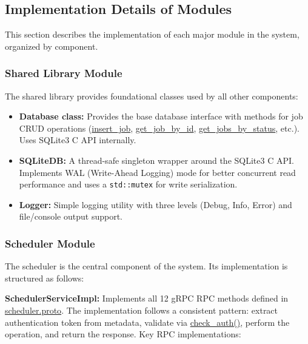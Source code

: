 \subsection{Implementation Details of Modules}

This section describes the implementation of each major module in the system, organized by component.

\subsubsection{Shared Library Module}

The shared library provides foundational classes used by all other components:

\begin{itemize}
	\item \textbf{Database class:} Provides the base database interface with methods for job CRUD operations (\url{insert_job}, \url{get_job_by_id}, \url{get_jobs_by_status}, etc.). Uses SQLite3 C API internally.
	\item \textbf{SQLiteDB:} A thread-safe singleton wrapper around the SQLite3 C API. Implements WAL (Write-Ahead Logging) mode for better concurrent read performance and uses a \texttt{std::mutex} for write serialization.
	\item \textbf{Logger:} Simple logging utility with three levels (Debug, Info, Error) and file/console output support.
\end{itemize}

\subsubsection{Scheduler Module}

The scheduler is the central component of the system. Its implementation is structured as follows:

\textbf{SchedulerServiceImpl:} Implements all 12 gRPC RPC methods defined in \url{scheduler.proto}. The implementation follows a consistent pattern: extract authentication token from metadata, validate via \url{check_auth()}, perform the operation, and return the response. Key RPC implementations:

